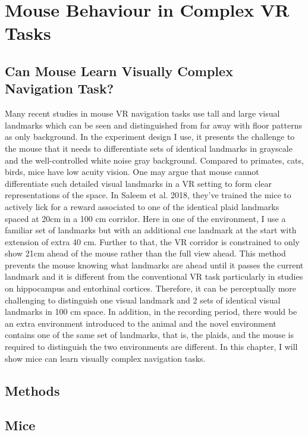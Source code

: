 \chapter{Mouse Behaviour in Complex VR Tasks}
\label{chapterlabel3}

\section{Can Mouse Learn Visually Complex Navigation Task?}
 Many recent studies in mouse VR navigation tasks use tall and large visual landmarks which can be seen and distinguished from far away with floor patterns as only background. In the experiment design I use, it presents the challenge to the mouse that it needs to differentiate sets of identical landmarks in grayscale and the well-controlled white noise gray background. Compared to primates, cats, birds, mice have low acuity vision. One may argue that mouse cannot differentiate such detailed visual landmarks in a VR setting to form clear representations of the space. In Saleem et al. 2018, they've trained the mice to actively lick for a reward associated to one of the identical plaid landmarks spaced at 20cm in a 100 cm corridor. Here in one of the environment, I use a familiar set of landmarks but with an additional cue landmark at the start with extension of extra 40 cm. Further to that, the VR corridor is constrained to only show 21cm ahead of the mouse rather than the full view ahead. This method prevents the mouse knowing what landmarks are ahead until it passes the current landmark and it is different from the conventional VR task particularly in studies on hippocampus and entorhinal cortices. Therefore, it can be perceptually more challenging to distinguish one visual landmark and 2 sets of identical visual landmarks in 100 cm space. In addition, in the recording period, there would be an extra environment introduced to the animal and the novel environment contains one of the same set of landmarks, that is, the plaids, and the mouse is required to distinguish the two environments are different. In this chapter, I will show mice can learn visually complex navigation tasks.

\section{Methods}






\section{Mice }

